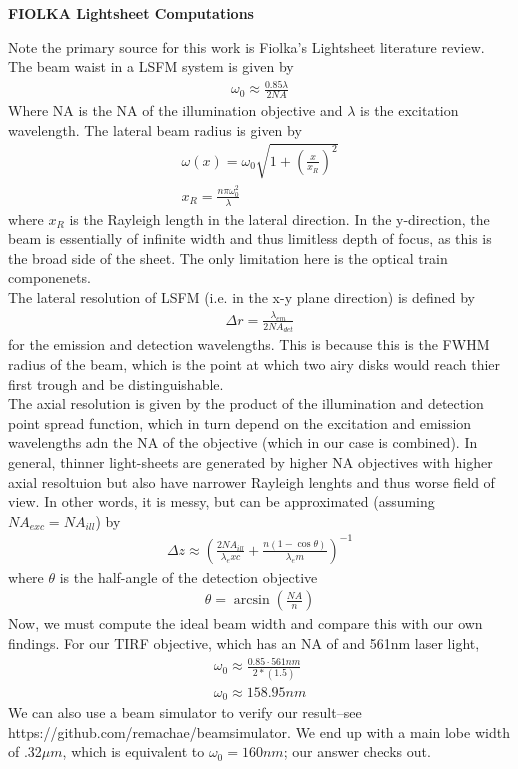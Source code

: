 \newpage
\begin{center}
    \textbf{FIOLKA Lightsheet Computations}\\
\end{center}
Note the primary source for this work is Fiolka's Lightsheet literature review. The beam waist in a LSFM system is given by 
\begin{gather}
    \omega_0 \approx \frac{0.85 \lambda}{2 NA}
\end{gather}
    Where NA is the NA of the illumination objective and $\lambda$ is the excitation wavelength. The lateral beam radius is given by 
    \begin{gather}
        \omega(x) = \omega_0 \sqrt{1 + \left(\frac{x}{x_R}\right)^2}\\
        x_R = \frac{n \pi \omega_0^2}{\lambda}
    \end{gather}
    where $x_R$ is the Rayleigh length in the lateral direction.
    In the y-direction, the beam is essentially of infinite width and thus limitless depth of focus, as this is the broad side of the sheet. The only limitation here is the optical train componenets.\\
    The lateral resolution of LSFM (i.e. in the x-y plane direction) is defined by 
    \begin{gather}
        \Delta r = \frac{\lambda_{em}}{2 NA_{det}}
    \end{gather}
    for the emission and detection wavelengths. This is because this is the FWHM radius of the beam, which is the point at which two airy disks would reach thier first trough and be distinguishable.\\
    The axial resolution is given by the product of the illumination and detection point spread function, which in turn depend on the excitation and emission wavelengths adn the NA of the objective (which in our case is combined). In general, thinner light-sheets are generated by higher NA objectives with higher axial resoltuion but also have narrower Rayleigh lenghts and thus worse field of view. In other words, it is messy, but can be approximated (assuming $NA_{exc}=NA_{ill}$) by
    \begin{gather}
        \Delta z \approx \left( \frac{2 NA_{ill}}{\lambda_exc} + \frac{n (1-\cos \theta)}{\lambda_em}\right)^{-1}
    \end{gather}
    where $\theta$ is the half-angle of the detection objective
    \begin{gather}
        \theta = \arcsin\left(\frac{NA}{n}\right)
    \end{gather}
    Now, we must compute the ideal beam width and compare this with our own findings. For our TIRF objective, which has an NA of and 561nm laser light,
    \begin{gather}
        \omega_0 \approx \frac{0.85\cdot561nm}{2*(1.5)}\\
        \omega_0 \approx 158.95nm
    \end{gather}
We can also use a beam simulator to verify our result--see https://github.com/remachae/beamsimulator. We end up with a main lobe width of .32$\mu m$, which is equivalent to $\omega_0=160nm$; our answer checks out.

